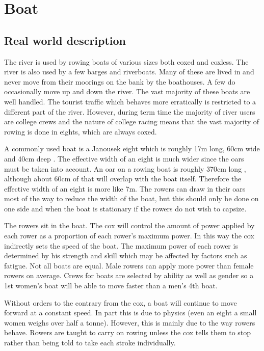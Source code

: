    \section{Boat}
      \subsection{Real world description}
      The river is used by rowing boats of various sizes both coxed and coxless. The river is also used by a few barges and riverboats. Many of these are lived in and never move from their moorings on the bank by the boathouses. A few do occasionally move up and down the river. The vast majority of these boats are well handled. The tourist traffic which behaves more erratically is restricted to a different part of the river. However, during term time the majority of river users are college crews and the nature of college racing means that the vast majority of rowing is done in eights, which are always coxed.
      
      A commonly used boat is a Janousek eight which is roughly 17m long, 60cm wide and 40cm deep \cite{Janousek}. The effective width of an eight is much wider since the oars must be taken into account. An oar on a rowing boat is roughly 370cm long \cite{Concept2}, although about 60cm of that will overlap with the boat itself. Therefore the effective width of an eight is more like 7m. The rowers can draw in their oars most of the way to reduce the width of the boat, but this should only be done on one side and when the boat is stationary if the rowers do not wish to capsize. 
      
      The rowers sit in the boat. The cox will control the amount of power applied by each rower as a proportion of each rower's maximum power. In this way the cox indirectly sets the speed of the boat. The maximum power of each rower is determined by his strength and skill which may be affected by factors such as fatigue. Not all boats are equal. Male rowers can apply more power than female rowers on average. Crews for boats are selected by ability as well as gender so a 1st women's boat will be able to move faster than a men's 4th boat.
      
      Without orders to the contrary from the cox, a boat will continue to move forward at a constant speed. In part this is due to physics (even an eight a small women weighs over half a tonne). However, this is mainly due to the way rowers behave. Rowers are taught to carry on rowing unless the cox tells them to stop rather than being told to take each stroke individually.
      
